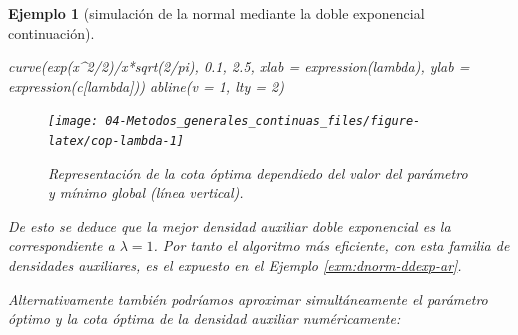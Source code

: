 \documentclass[
  10pt,
]{book}
\newenvironment{Shaded}{\begin{snugshade}}{\end{snugshade}}
\newcommand{\AttributeTok}[1]{\textcolor[rgb]{0.77,0.63,0.00}{#1}}
\newcommand{\CommentTok}[1]{\textcolor[rgb]{0.56,0.35,0.01}{\textit{#1}}}
\newcommand{\ConstantTok}[1]{\textcolor[rgb]{0.00,0.00,0.00}{#1}}
\newcommand{\ControlFlowTok}[1]{\textcolor[rgb]{0.13,0.29,0.53}{\textbf{#1}}}
\newcommand{\DecValTok}[1]{\textcolor[rgb]{0.00,0.00,0.81}{#1}}
\newcommand{\FloatTok}[1]{\textcolor[rgb]{0.00,0.00,0.81}{#1}}
\newcommand{\FunctionTok}[1]{\textcolor[rgb]{0.00,0.00,0.00}{#1}}
\newcommand{\NormalTok}[1]{#1}
\newcommand{\OtherTok}[1]{\textcolor[rgb]{0.56,0.35,0.01}{#1}}
\newcommand{\SpecialCharTok}[1]{\textcolor[rgb]{0.00,0.00,0.00}{#1}}
\theoremstyle{break}
\newtheorem{example}{Ejemplo}[chapter]
\theoremstyle{nonumberplain}
\renewcommand{\CommentTok}[1]{\textcolor[rgb]{0.41,0.41,0.41}{\texttt{#1}}}
\begin{document}
\begin{example}[simulación de la normal mediante la doble exponencial continuación]
\begin{Shaded}
\begin{Highlighting}[]
\FunctionTok{curve}\NormalTok{(}\FunctionTok{exp}\NormalTok{(x}\SpecialCharTok{\^{}}\DecValTok{2}\SpecialCharTok{/}\DecValTok{2}\NormalTok{)}\SpecialCharTok{/}\NormalTok{x}\SpecialCharTok{*}\FunctionTok{sqrt}\NormalTok{(}\DecValTok{2}\SpecialCharTok{/}\NormalTok{pi), }\FloatTok{0.1}\NormalTok{, }\FloatTok{2.5}\NormalTok{,}
       \AttributeTok{xlab =} \FunctionTok{expression}\NormalTok{(lambda), }\AttributeTok{ylab =} \FunctionTok{expression}\NormalTok{(c[lambda]))}
\FunctionTok{abline}\NormalTok{(}\AttributeTok{v =} \DecValTok{1}\NormalTok{, }\AttributeTok{lty =} \DecValTok{2}\NormalTok{)}
\end{Highlighting}
\end{Shaded}

\begin{figure}[!htbp]

{\centering \texttt{[image: 04-Metodos\_generales\_continuas\_files/figure-latex/cop-lambda-1]} 

}

\caption{Representación de la cota óptima dependiedo del valor del parámetro y mínimo global (línea vertical).}\label{fig:cop-lambda}
\end{figure}

De esto se deduce que la mejor densidad auxiliar doble exponencial es la correspondiente a \(\lambda=1\).
Por tanto el algoritmo más eficiente, con esta familia de densidades auxiliares, es el expuesto en el Ejemplo \ref{exm:dnorm-ddexp-ar}.

Alternativamente también podríamos aproximar simultáneamente el parámetro óptimo y la cota óptima de la densidad auxiliar numéricamente:

\begin{Shaded}
\end{Shaded}
\end{example}
\end{document}
